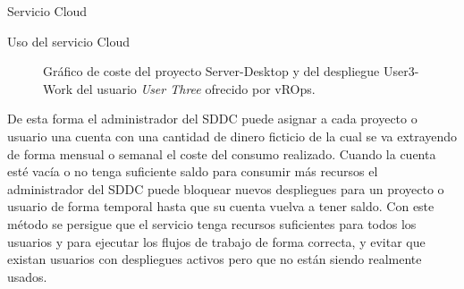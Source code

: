 \begin{subsection}{Servicio Cloud}
\begin{subsubsection}{Uso del servicio Cloud}
\begin{figure}[h]
            \caption{Gráfico de coste del proyecto Server-Desktop y del despliegue User3-Work del usuario \textit{User Three} ofrecido por vROps.}
            \label{fig:vrops-graf-user3}
        \end{figure}
        \FloatBarrier
        De esta forma el administrador del SDDC puede asignar a cada proyecto o usuario una cuenta con una cantidad de dinero ficticio de la cual se va extrayendo de forma mensual o semanal el coste del consumo realizado. Cuando la cuenta esté vacía o no tenga suficiente saldo para consumir más recursos el administrador del SDDC puede bloquear nuevos despliegues para un proyecto o usuario de forma temporal  hasta que su cuenta vuelva a tener saldo. Con este método se persigue que el servicio tenga recursos suficientes para todos los usuarios y para ejecutar los flujos de trabajo de forma correcta, y evitar que existan usuarios con despliegues activos pero que no están siendo realmente usados.
    \end{subsubsection}
    

\end{subsection}

